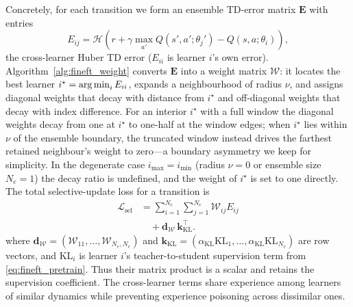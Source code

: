 Concretely, for each transition we form an ensemble TD-error matrix $\mathbf{E}$ with entries
\begin{equation}
\label{eq:fineft_etd}
E_{ij} = \mathcal{H}\!\left(r + \gamma\max_{a'}Q(s',a';\theta_j') - Q(s,a;\theta_i)\right),
\end{equation}
the cross-learner Huber TD error ($E_{ii}$ is learner $i$'s own error). Algorithm~\ref{alg:fineft_weight} converts $\mathbf{E}$ into a weight matrix $\mathcal{W}$: it locates the best learner $i^\star=\operatorname*{arg\,min}_i E_{ii}$, expands a neighbourhood of radius $\nu$, and assigns diagonal weights that decay with distance from $i^\star$ and off-diagonal weights that decay with index difference. For an interior $i^\star$ with a full window the diagonal weights decay from one at $i^\star$ to one-half at the window edges; when $i^\star$ lies within $\nu$ of the ensemble boundary, the truncated window instead drives the farthest retained neighbour's weight to zero---a boundary asymmetry we keep for simplicity. In the degenerate case $i_{\max}=i_{\min}$ (radius $\nu=0$ or ensemble size $N_e=1$) the decay ratio is undefined, and the weight of $i^\star$ is set to one directly. The total selective-update loss for a transition is
\begin{equation}
\label{eq:fineft_final_loss}
\begin{aligned}
\mathcal{L}_{\mathrm{sel}}
&= \sum_{i=1}^{N_e}\sum_{j=1}^{N_e}\mathcal{W}_{ij}E_{ij}\\[-1pt]
&\quad+ \mathbf{d}_{\mathcal{W}}\,\mathbf{k}_{\mathrm{KL}}^{\top}.
\end{aligned}
\end{equation}
where $\mathbf{d}_{\mathcal{W}}=(\mathcal{W}_{11},\ldots,\mathcal{W}_{N_e,N_e})$ and $\mathbf{k}_{\mathrm{KL}}=(\alpha_{\mathrm{KL}}\mathrm{KL}_1,\ldots,\alpha_{\mathrm{KL}}\mathrm{KL}_{N_e})$ are row vectors, and $\mathrm{KL}_i$ is learner $i$'s teacher-to-student supervision term from \eqref{eq:fineft_pretrain}. Thus their matrix product is a scalar and retains the supervision coefficient. The cross-learner terms share experience among learners of similar dynamics while preventing experience poisoning across dissimilar ones.

